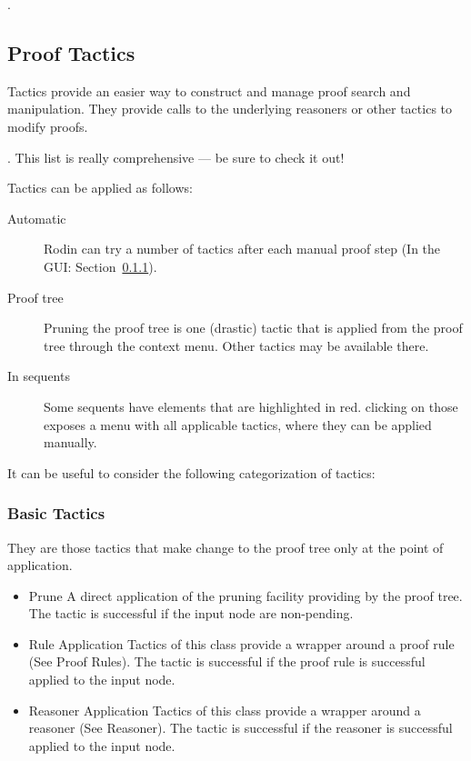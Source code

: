 .

\subsection{Proof Tactics}

Tactics provide an easier way to construct and manage proof search and manipulation. They provide calls to the underlying reasoners or other tactics to modify proofs.

.  This list is really comprehensive --- be sure to check it out!

Tactics can be applied as follows:

\begin{description}
	\item[Automatic] Rodin can try a number of tactics after each manual proof step (In the GUI: Section~\ref{}).
	\item[Proof tree] Pruning the proof tree is one (drastic) tactic that is applied from the proof tree through the context menu.  Other tactics may be available there.
	\item[In sequents] Some sequents have elements that are highlighted in red.  clicking on those exposes a menu with all applicable tactics, where they can be applied manually.
\end{description}

It can be useful to consider the following categorization of tactics:

\subsubsection{Basic Tactics}

They are those tactics that make change to the proof tree only at the point of application.

\begin{itemize}
	\item     Prune A direct application of the pruning facility providing by the proof tree. The tactic is successful if the input node are non-pending. 
	\item     Rule Application Tactics of this class provide a wrapper around a proof rule (See Proof Rules). The tactic is successful if the proof rule is successful applied to the input node. 

	\item     Reasoner Application Tactics of this class provide a wrapper around a reasoner (See Reasoner). The tactic is successful if the reasoner is successful applied to the input node. 
\end{itemize}

